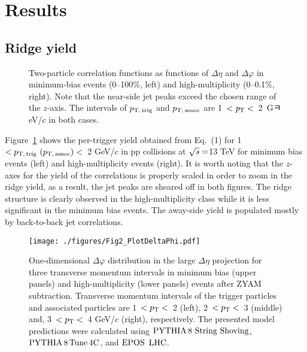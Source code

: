 
\section {Results}
\label{sec:results}

\subsection{Ridge yield}
\label{sec:resultunbiased}
\begin{figure}[b!]
	\centering
	\caption{ Two-particle correlation functions as functions of $\Delta\eta$ and $\Delta\varphi$ in minimum-bias events (0--100\%, left) and high-multiplicity (0--0.1\%, right). Note that the near-side jet peaks exceed the chosen range of the $z$-axis. The intervals of $p_\mathrm{T,\,trig}$ and $p_\mathrm{T,\,assoc}$ are 1~$<\it{p}_{\rm{T}}<$~2~GㅋeV/$c$ in both cases.}
	\label{fig:PlotCorrMBHMT}
\end{figure}

Figure~\ref{fig:PlotCorrMBHMT} shows the per-trigger yield obtained from Eq.~(1) for 1~$<p_\mathrm{T,\,trig}~\mathrm (p_\mathrm{T,\,assoc})<$~2 GeV/$c$ in pp collisions at $\sqrt{\it{s}} = $\unit{13} {\rm{}TeV} for minimum bias events (left) and high-multiplicity events (right). It is worth noting that the $z$-axes for the yield of the correlations is properly scaled in order to zoom in the ridge yield, as a result, the jet peaks are sheared off in both figures. The ridge structure is clearly observed in the high-multiplicity class while it is less significant in the minimum bias events. The away-side yield is populated mostly by back-to-back jet correlations.

\begin{figure}[h!]
	\centering
	\texttt{[image: ./figures/Fig2\_PlotDeltaPhi.pdf]}
	\caption{One-dimensional $\Delta\varphi$ distribution in the large $\Delta\eta$ projection for three transverse momentum intervals in minimum bias (upper panels) and high-multiplicity (lower panels) events after ZYAM subtraction. Transverse momentum intervals of the trigger particles and associated particles are 1~$<p_\mathrm{T}<$~2 (left), 2~$<p_\mathrm{T}<$~3 (middle) and, 3~$<p_\mathrm{T}<$~4 GeV/$c$ (right), respectively. The presented model predictions were calculated using ${\mathrm{PYTHIA}\,8~\mathrm{String}~}\mathrm{Shoving}$, $\mathrm{PYTHIA}\,8\,\mathrm{Tune\,4C}$, and ${\mathrm{EPOS}\,~\mathrm{LHC}}$.}
	\label{fig:PlotDeltaPhi}
\end{figure}
 
